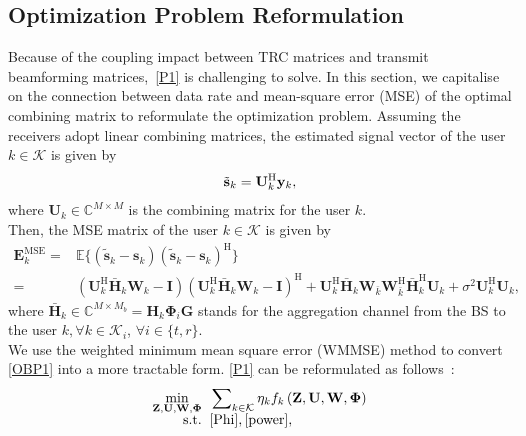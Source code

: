 \documentclass[12pt, draftclsnofoot, onecolumn]{IEEEtran}
\begin{document}
\subsection{Optimization Problem Reformulation}
{Because of the coupling impact between TRC matrices and transmit beamforming matrices,~\eqref{P1} is challenging to solve. In this section, we capitalise on the connection between data rate and mean-square error (MSE) of the optimal combining matrix to reformulate the optimization problem.} 
Assuming the receivers adopt linear combining matrices, the estimated signal vector of the user $k\in\mathcal{K}$ is given by\vspace{-0.1cm}
\begin{equation}
\begin{aligned}
\tilde{\mathbf{s}}_k=\mathbf{U}_k^\mathrm{H}\mathbf{y}_k,
\end{aligned}
\vspace{-0.1cm}
\end{equation}
where ${\mathbf{U}}_k\in\mathbb{C}^{M \times M}$ is the combining matrix for the user $k$.\\
\indent Then, the MSE matrix of the user $k\in\mathcal{K}$ is given by
\begin{equation}\label{EMSE}
\begin{aligned}
{\mathbf{E}}_k^{\text{MSE}}=&\mathbb{E}\{\left(\tilde{\mathbf{s}}_k-{\mathbf{s}}_k\right)\left(\tilde{\mathbf{s}}_k-{\mathbf{s}}_k\right)^\mathrm{H}\}\\
=&\left(\mathbf{U}_k^\mathrm{H}\bar{\mathbf{H}}_k\mathbf{W}_k-\mathbf{I}\right)\left(\mathbf{U}_k^\mathrm{H}\bar{\mathbf{H}}_k\mathbf{W}_k-\mathbf{I}\right)^\mathrm{H}+\mathbf{U}_k^\mathrm{H}\bar{\mathbf{H}}_k\mathbf{W}_{\bar{k}}\mathbf{W}_{\bar{k}}^\mathrm{H}\bar{\mathbf{H}}_k^\mathrm{H}\mathbf{U}_k+\sigma^2\mathbf{U}_k^\mathrm{H}\mathbf{U}_k,
\end{aligned}
\end{equation} 
where $\bar{\mathbf{H}}_k\in\mathbb{C}^{M \times M_b}={\mathbf{H}}_k{\mathbf{\Phi}}_i{\mathbf{G}}$ stands for the aggregation channel from the BS to the user $k, \forall k \in \mathcal{K}_i$, $\forall i \in \{t,r\}$.\\
\indent  We use the weighted minimum mean square error (WMMSE) method to convert \eqref{OBP1} into a more tractable form. \eqref{P1} can be reformulated as follows~\cite{shi2011iteratively}:
\begin{subequations}\label{P2}
\begin{align}
\label{OBP2}\mathop {\min }\limits_{ {{\mathbf{Z}},{\mathbf{U}},{\mathbf{W}},{\mathbf{\Phi}}} } \;\;&\sum\nolimits_{k\in\mathcal{K}}\eta_kf_k\left(\mathbf{Z},\mathbf{U},\mathbf{W},\mathbf{\Phi}\right)\\[-0.2cm]
{\rm{s.t.}}\;\;& \eqref{Phi},\eqref{power},
\end{align}
\end{subequations}
\end{document}
